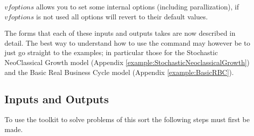 $vfoptions$ allows you to set some internal options (including parallization), if $vfoptions$ is not used all options will revert to their default values.

The forms that each of these inputs and outputs takes are now described in detail. The best way to understand how to use the
command may however be to just go straight to the examples; in particular those for the Stochastic NeoClassical Growth model
(Appendix \ref{example:StochasticNeoclassicalGrowth}) and the Basic Real Business Cycle model (Appendix \ref{example:BasicRBC}).

\subsection{Inputs and Outputs}
To use the toolkit to solve problems of this sort the following steps must first be made.
